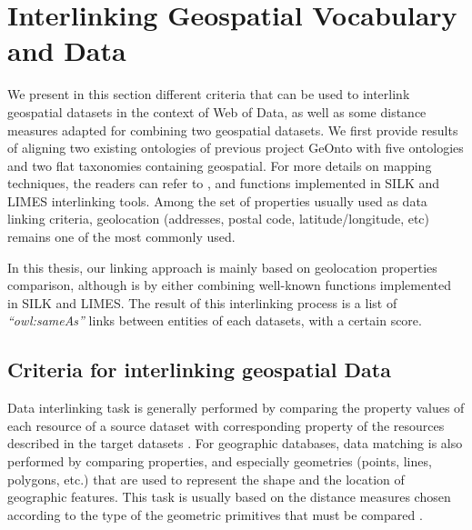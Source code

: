 \section{Interlinking Geospatial Vocabulary and Data}
\label{sec:interlinking}

We present in this section different criteria that can be used to interlink geospatial datasets in the context of Web of Data, as well as some distance measures adapted for combining two geospatial datasets. We first provide results of aligning two existing ontologies of previous project GeOnto with five ontologies and two flat taxonomies containing geospatial. For more details on mapping techniques, the readers can refer to \cite{euzenat2007}, and functions implemented in SILK \cite{jentzsch2010silk,isele2011} and LIMES \cite{ngau11} interlinking tools. Among the set of properties usually used as data linking criteria, geolocation (addresses, postal code, latitude/longitude, etc) remains one of the most commonly used.

In this thesis, our linking approach is mainly based on geolocation properties comparison, although is by either combining well-known functions implemented in SILK and LIMES. The result of this interlinking process is a list of \textit{``owl:sameAs''} links between entities of each datasets, with a certain score.



\subsection{Criteria for interlinking geospatial Data}
Data interlinking task is generally performed by comparing the property values of each resource of a source dataset with corresponding property of the resources described in the target datasets \cite{scharffe2010}. For geographic databases, data matching is also performed by comparing properties, and especially geometries (points, lines, polygons, etc.) that are used to represent the shape and the location of geographic features. This task is usually based on the distance measures chosen according to the type of the geometric primitives that must be compared \cite{mustiere2008,anamaria08,Julius09,walter1999}.


